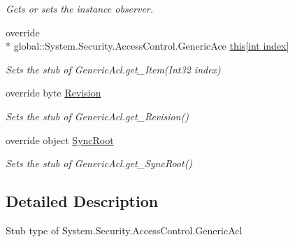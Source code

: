 \begin{DoxyCompactItemize}
\begin{DoxyCompactList}\small\item\em Gets or sets the instance observer.\end{DoxyCompactList}\item 
override \\*
global\-::\-System.\-Security.\-Access\-Control.\-Generic\-Ace \hyperlink{class_system_1_1_security_1_1_access_control_1_1_fakes_1_1_stub_generic_acl_a3cbaf1556a0fdb472a8f281b82a76250}{this\mbox{[}int index\mbox{]}}
\begin{DoxyCompactList}\small\item\em Sets the stub of Generic\-Acl.\-get\-\_\-\-Item(\-Int32 index)\end{DoxyCompactList}\item 
override byte \hyperlink{class_system_1_1_security_1_1_access_control_1_1_fakes_1_1_stub_generic_acl_a5257e87094f5233d5ee8548d55574f95}{Revision}
\begin{DoxyCompactList}\small\item\em Sets the stub of Generic\-Acl.\-get\-\_\-\-Revision()\end{DoxyCompactList}\item 
override object \hyperlink{class_system_1_1_security_1_1_access_control_1_1_fakes_1_1_stub_generic_acl_a8652bc2da002457aafb4dedca466def4}{Sync\-Root}
\begin{DoxyCompactList}\small\item\em Sets the stub of Generic\-Acl.\-get\-\_\-\-Sync\-Root()\end{DoxyCompactList}\end{DoxyCompactItemize}


\subsection{Detailed Description}
Stub type of System.\-Security.\-Access\-Control.\-Generic\-Acl



